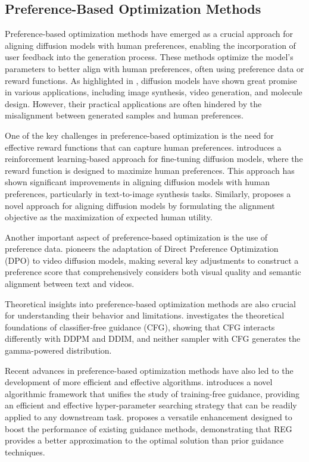 \documentclass[11pt,a4paper]{article}
\begin{document}
\subsection{Preference-Based Optimization Methods}


Preference-based optimization methods have emerged as a crucial approach for aligning diffusion models with human preferences, enabling the incorporation of user feedback into the generation process. These methods optimize the model's parameters to better align with human preferences, often using preference data or reward functions. As highlighted in \cite{doi:10.1145/3626235}, diffusion models have shown great promise in various applications, including image synthesis, video generation, and molecule design. However, their practical applications are often hindered by the misalignment between generated samples and human preferences.

One of the key challenges in preference-based optimization is the need for effective reward functions that can capture human preferences. \cite{arxiv:2305.13301} introduces a reinforcement learning-based approach for fine-tuning diffusion models, where the reward function is designed to maximize human preferences. This approach has shown significant improvements in aligning diffusion models with human preferences, particularly in text-to-image synthesis tasks. Similarly, \cite{arxiv:2404.04465} proposes a novel approach for aligning diffusion models by formulating the alignment objective as the maximization of expected human utility.

Another important aspect of preference-based optimization is the use of preference data. \cite{doi:10.1109/cvpr52734.2025.00750} pioneers the adaptation of Direct Preference Optimization (DPO) to video diffusion models, making several key adjustments to construct a preference score that comprehensively considers both visual quality and semantic alignment between text and videos.

Theoretical insights into preference-based optimization methods are also crucial for understanding their behavior and limitations. \cite{arxiv:2408.09000} investigates the theoretical foundations of classifier-free guidance (CFG), showing that CFG interacts differently with DDPM and DDIM, and neither sampler with CFG generates the gamma-powered distribution.

Recent advances in preference-based optimization methods have also led to the development of more efficient and effective algorithms. \cite{arxiv:2409.15761} introduces a novel algorithmic framework that unifies the study of training-free guidance, providing an efficient and effective hyper-parameter searching strategy that can be readily applied to any downstream task. \cite{arxiv:2501.18865} proposes a versatile enhancement designed to boost the performance of existing guidance methods, demonstrating that REG provides a better approximation to the optimal solution than prior guidance techniques.
\end{document}
